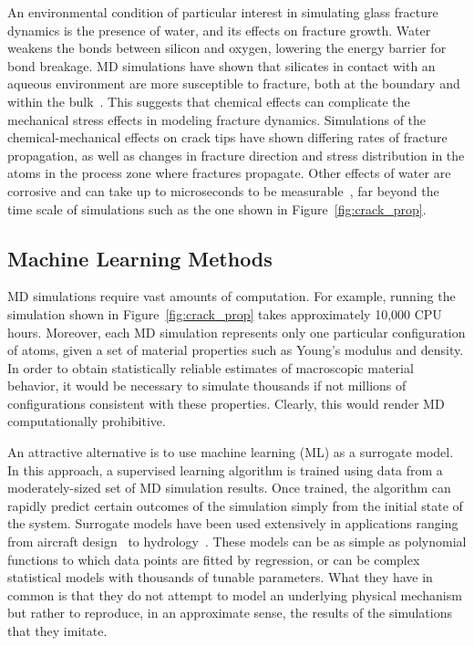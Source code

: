 An environmental condition of particular interest in simulating glass fracture dynamics is the presence of water, and its effects on fracture growth. Water weakens the bonds between silicon and oxygen, lowering the energy barrier for bond breakage. MD simulations have shown that silicates in contact with an aqueous environment are more susceptible to fracture, both at the boundary and within the bulk~\cite{chem_effects}. This suggests that chemical effects can complicate the mechanical stress effects in modeling fracture dynamics. Simulations of the chemical-mechanical effects on crack tips have shown differing rates of fracture propagation, as well as changes in fracture direction and stress distribution in the atoms in the process zone where fractures propagate. Other effects of water are corrosive and can take up to microseconds to be measurable~\cite{markpres}, far beyond the time scale of simulations such as the one shown in Figure~\ref{fig:crack_prop}.

\subsection{Machine Learning Methods} 

MD simulations require vast amounts of computation. For example, running the simulation shown in Figure~\ref{fig:crack_prop} takes approximately 10,000 CPU hours. Moreover, each MD simulation represents only one particular configuration of atoms, given a set of material properties such as Young's modulus and density. In order to obtain statistically reliable estimates of macroscopic material behavior, it would be necessary to simulate thousands if not millions of configurations consistent with these properties.  Clearly, this would render MD computationally prohibitive.

An attractive alternative is to use machine learning (ML) as a surrogate model.  In this approach, a supervised learning algorithm is trained using data from a moderately-sized set of MD simulation results.  Once trained, the algorithm can rapidly predict certain outcomes of the simulation simply from the initial state of the system.  Surrogate models have been used extensively in applications ranging from aircraft design~\cite{mack2007surrogate} to hydrology~\cite{razavi2012review}.  These models can be as simple as polynomial functions to which data points are fitted by regression, or can be complex statistical models with thousands of tunable parameters.  What they have in common is that they do not attempt to model an underlying physical mechanism but rather to reproduce, in an approximate sense, the results of the simulations that they imitate.

